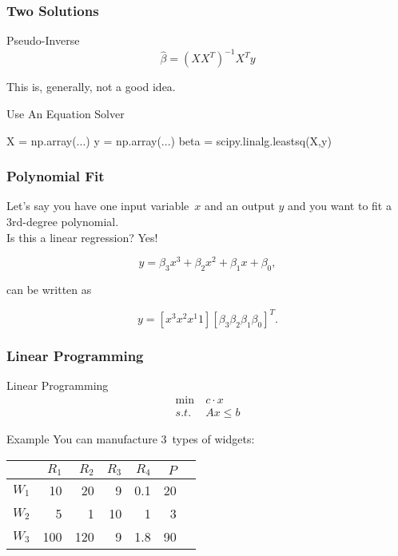 \begin{frame}[fragile]
\frametitle{Two Solutions}

\begin{block}{Pseudo-Inverse}
\[
\hat{\beta} = (X X^T)^{-1}X^T y
\]
\end{block}

This is, generally, not a good idea.
\pause
\begin{block}{Use An Equation Solver}
\begin{python}
X = np.array(...)
y = np.array(...)
beta = scipy.linalg.leastsq(X,y)
\end{python}
\end{block}
\end{frame}

\begin{frame}[fragile]
\frametitle{Polynomial Fit}

Let's say you have one input variable~$x$ and an output $y$ and you want to fit a 3rd-degree polynomial.\\
Is this a linear regression?
\pause
Yes!

\[
y = \beta_3 x^3 + \beta_2 x^2 + \beta_1 x + \beta_0,
\]

can be written as

\[
y = [ x^3 x^2 x^1 1] [\beta_3 \beta_2 \beta_1 \beta_0 ]^{T}.
\]
\end{frame}

\begin{frame}[fragile]
\frametitle{Linear Programming}
\begin{block}{Linear Programming}
\begin{align*}
\min & c\cdot x\\
s.t.\,\,\,& Ax \le b
\end{align*}
\end{block}

\begin{block}{Example}
You can manufacture 3~types of widgets:
\begin{center}
\begin{tabular}{lrrrrrr}
\toprule
      & $R_1$ & $R_2$ & $R_3$ & $R_4$ & $P$ \\
\midrule                      
$W_1$ &   10  &   20  &    9  &  0.1  & 20  \\
$W_2$ &    5  &    1  &   10  &    1  &  3  \\
$W_3$ &  100  &  120  &    9  &  1.8  & 90  \\
\bottomrule
\end{tabular}
\end{center}
\end{block}
\end{frame}

